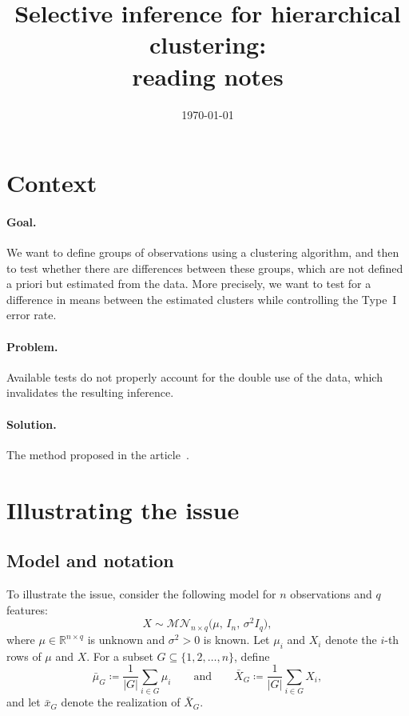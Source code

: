 \documentclass[11pt,a4paper]{article}
\title{Selective inference for hierarchical clustering:\\ reading notes}
\author{}
\date{\today}
\newcommand{\MN}{\mathcal{MN}}                     %
\begin{document}
\maketitle

\section{Context}

\paragraph{Goal.}
We want to define groups of observations using a clustering algorithm, and then to test whether there are differences between these groups, which are not defined a priori but estimated from the data. More precisely, we want to test for a difference in means between the estimated clusters while controlling the Type~I error rate.

\paragraph{Problem.}
Available tests do not properly account for the double use of the data, which invalidates the resulting inference.

\paragraph{Solution.}
The method proposed in the article~\cite{gao2024}.

\section{Illustrating the issue}

\subsection{Model and notation}

To illustrate the issue, consider the following model for $n$ observations and $q$ features:
\[
  X \sim \MN_{n\times q}\bigl(\mu,\, I_n,\, \sigma^2 I_q\bigr),
\]
where $\mu \in \mathbb{R}^{n\times q}$ is unknown and $\sigma^2>0$ is known. Let $\mu_i$ and $X_i$ denote the $i$-th rows of $\mu$ and $X$. For a subset $G \subseteq \{1,2,\dots,n\}$, define
\[
  \bar{\mu}_G \coloneqq \frac{1}{|G|}\sum_{i\in G}\mu_i
  \qquad\text{and}\qquad
  \bar{X}_G \coloneqq \frac{1}{|G|}\sum_{i\in G}X_i ,
\]
and let $\bar{x}_G$ denote the realization of $\bar{X}_G$.
\end{document}
